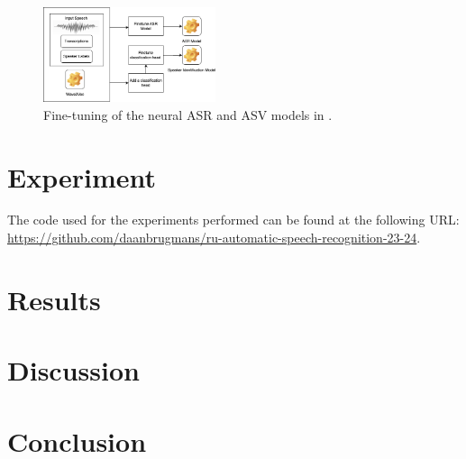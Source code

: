 \documentclass[11pt]{article}
\begin{document}
\begin{figure}
  \centering
  \includegraphics[width=0.45\textwidth]{roddeman_etal_models.png}
  \caption{Fine-tuning of the neural ASR and ASV models in \citet{roddeman2024anonymization}.}
  \label{fig:roddeman_etal_models}
\end{figure}

\section{Experiment}


The code used for the experiments performed can be found at the following URL: \url{https://github.com/daanbrugmans/ru-automatic-speech-recognition-23-24}.

\citet{kim2020torchattacks}

\section{Results}

\section{Discussion}

\section{Conclusion}



\appendix
\end{document}

